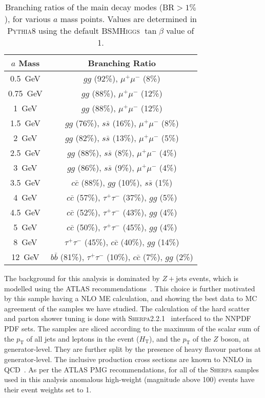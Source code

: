 \documentclass[NOTE, atlasdraft=true, texlive=2017, UKenglish]{\ATLASLATEXPATH atlasdoc}
\begin{document}
\begin{table}[!htbp]{\footnotesize\renewcommand{\arraystretch}{1.2}
    \begin{center}
      \begin{tabular}{|c|c|}
        \hline
        $a$ Mass & Branching Ratio\\
        \hline
        0.5~GeV & $gg$ (92\%), $\mu^+\mu^-$ (8\%)\\
        0.75~GeV & $gg$ (88\%), $\mu^+\mu^-$ (12\%)\\
        1~GeV & $gg$ (88\%), $\mu^+\mu^-$ (12\%)\\
        1.5~GeV & $gg$ (76\%), $s\bar s$ (16\%), $\mu^+\mu^-$ (8\%)\\
        2~GeV & $gg$ (82\%), $s\bar s$ (13\%), $\mu^+\mu^-$ (5\%)\\
        2.5~GeV & $gg$ (88\%), $s\bar s$ (8\%), $\mu^+\mu^-$ (4\%)\\
        3~GeV & $gg$ (86\%), $s\bar s$ (9\%), $\mu^+\mu^-$ (4\%)\\
        3.5~GeV & $c\bar c$ (88\%), $gg$ (10\%), $s\bar s$ (1\%)\\
        4~GeV & $c\bar c$ (57\%), $\tau^+\tau^-$ (37\%), $gg$ (5\%)\\
        4.5~GeV & $c\bar c$ (52\%), $\tau^+\tau^-$ (43\%), $gg$ (4\%)\\
        5~GeV & $c\bar c$ (50\%), $\tau^+\tau^-$ (45\%), $gg$ (4\%)\\
        8~GeV & $\tau^+\tau^-$ (45\%), $c\bar c$ (40\%), $gg$ (14\%)\\
        12~GeV & $b\bar b$ (81\%), $\tau^+\tau^-$ (10\%), $c\bar c$ (7\%), $gg$ (2\%)\\
        \hline
      \end{tabular}
      \caption{Branching ratios of the main decay modes (BR$>1\%$), for various $a$ mass points. Values are determined in \textsc{Pythia}8 using the default \textsc{BSMHiggs} $\tan\beta$ value of 1.}
      \label{tab:a0brs}
  \end{center}}
\end{table}

The background for this analysis is dominated by $Z+\text{jets}$ events, which is modelled using the ATLAS recommendations~\cite{ATL-PHYS-PUB-2016-003}. This choice is further motivated by this sample having a NLO ME calculation, and showing the best data to MC agreement of the samples we have studied. The calculation of the hard scatter and parton shower tuning is done with \textsc{Sherpa}2.2.1~\cite{1126-6708-2009-02-007} interfaced to the NNPDF~\cite{Ball:2012cx} PDF sets. The samples are sliced according to the maximum of the scalar sum of the $p_\text{T}$ of all jets and leptons in the event ($H_\text{T}$), and the $p_\text{T}$ of the $Z$ boson, at generator-level. They are further split by the presence of heavy flavour partons at generator-level. The inclusive production cross sections are known to NNLO in QCD~\cite{Butterworth:1287902}. As per the ATLAS PMG recommendations, for all of the \textsc{Sherpa} samples used in this analysis anomalous high-weight (magnitude above 100) events have their event weights set to 1.
\end{document}
